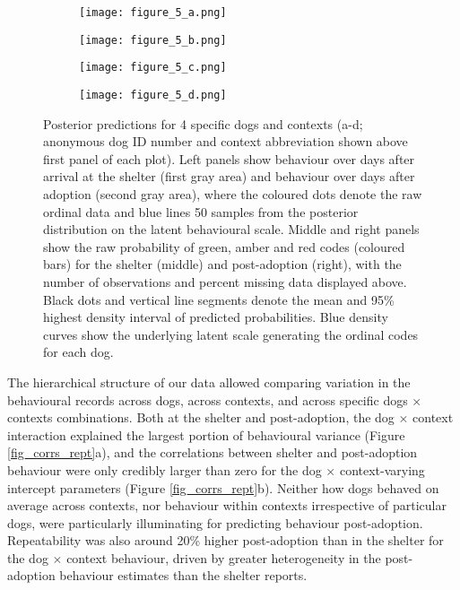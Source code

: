 \documentclass[12pt]{article}
\begin{document}
\begin{figure}[t!]
  \centering
  \begin{subfigure}{1\textwidth}
    \centering
    \texttt{[image: figure\_5\_a.png]}
  \end{subfigure}
  \begin{subfigure}{1\textwidth}
    \centering
    \vspace{-0.6cm}
    \texttt{[image: figure\_5\_b.png]}
  \end{subfigure}
  \begin{subfigure}{1\textwidth}
    \centering
    \vspace{-0.6cm}
    \texttt{[image: figure\_5\_c.png]}
  \end{subfigure}
  \begin{subfigure}{1\textwidth}
    \centering
    \vspace{-0.6cm}
    \texttt{[image: figure\_5\_d.png]}
  \end{subfigure}%
  \caption{\footnotesize{
  Posterior predictions for 4 specific dogs and contexts (a-d; anonymous dog ID number and context abbreviation shown above first panel of each plot). Left panels show behaviour over days after arrival at the shelter (first gray area) and behaviour over days after adoption (second gray area), where the coloured dots denote the raw ordinal data and blue lines 50 samples from the posterior distribution on the latent behavioural scale. Middle and right panels show the raw probability of green, amber and red codes (coloured bars) for the shelter (middle) and post-adoption (right), with the number of observations and percent missing data displayed above. Black dots and vertical line segments denote the mean and 95\% highest density interval of predicted probabilities. Blue density curves show the underlying latent scale generating the ordinal codes for each dog.}
  }
  \label{fig_pps}
\end{figure}

The hierarchical structure of our data allowed comparing variation in the behavioural records across dogs, across contexts, and across specific dogs $\times$ contexts combinations. Both at the shelter and post-adoption, the dog $\times$ context interaction explained the largest portion of behavioural variance (Figure \ref{fig_corrs_rept}a), and the correlations between shelter and post-adoption behaviour were only credibly larger than zero for the dog $\times$ context-varying intercept parameters (Figure \ref{fig_corrs_rept}b). Neither how dogs behaved on average across contexts, nor behaviour within contexts irrespective of particular dogs, were particularly illuminating for predicting behaviour post-adoption. Repeatability was also around 20\% higher post-adoption than in the shelter for the dog $\times$ context behaviour, driven by greater heterogeneity in the post-adoption behaviour estimates than the shelter reports.
\end{document}
